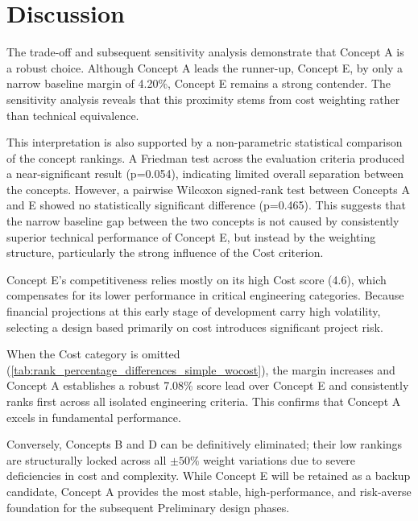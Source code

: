 \section{Discussion}
The trade-off and subsequent sensitivity analysis demonstrate that Concept A is a robust choice. Although Concept A leads the runner-up, Concept E, by only a narrow baseline margin of 4.20\%, Concept E remains a strong contender. The sensitivity analysis reveals that this proximity stems from cost weighting rather than technical equivalence.


This interpretation is also supported by a non-parametric statistical comparison of the concept rankings. A Friedman test across the evaluation criteria produced a near-significant result (p=0.054), indicating limited overall separation between the concepts. However, a pairwise Wilcoxon signed-rank test between Concepts A and E showed no statistically significant difference (p=0.465). This suggests that the narrow baseline gap between the two concepts is not caused by consistently superior technical performance of Concept E, but instead by the weighting structure, particularly the strong influence of the Cost criterion.





Concept E's competitiveness relies mostly on its high Cost score (4.6), which compensates for its lower performance in critical engineering categories. Because financial projections at this early stage of development carry high volatility, selecting a design based primarily on cost introduces significant project risk. 

When the Cost category is omitted (\autoref{tab:rank_percentage_differences_simple_wocost}), the margin increases and Concept A establishes a robust 7.08\% score lead over Concept E and consistently ranks first across all isolated engineering criteria. This confirms that Concept A excels in fundamental performance.


Conversely, Concepts B and D can be definitively eliminated; their low rankings are structurally locked across all $\pm 50\%$ weight variations due to severe deficiencies in cost and complexity. While Concept E will be retained as a backup candidate, Concept A provides the most stable, high-performance, and risk-averse foundation for the subsequent Preliminary design phases.
